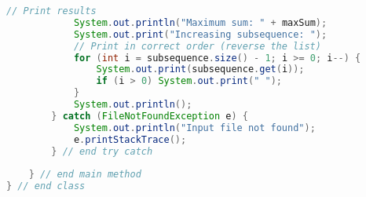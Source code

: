 \documentclass[11pt]{article}
\begin{document}
\begin{lstlisting}[language=Java]
            // Print results
            System.out.println("Maximum sum: " + maxSum);
            System.out.print("Increasing subsequence: ");
            // Print in correct order (reverse the list)
            for (int i = subsequence.size() - 1; i >= 0; i--) {
                System.out.print(subsequence.get(i));
                if (i > 0) System.out.print(" ");
            }
            System.out.println();
        } catch (FileNotFoundException e) {
            System.out.println("Input file not found");
            e.printStackTrace();
        } // end try catch
    	           
    } // end main method
} // end class
\end{lstlisting}
\end{document}
